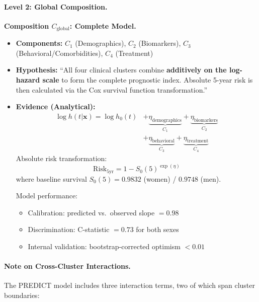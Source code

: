 \documentclass{article}
\begin{document}
\paragraph{Level 2: Global Composition.}

\textbf{Composition $C_{\text{global}}$: Complete Model.}
\begin{itemize}
    \item \textbf{Components:} $C_1$ (Demographics), $C_2$ (Biomarkers), $C_3$ (Behavioral/Comorbidities), $C_4$ (Treatment)
    \item \textbf{Hypothesis:} ``All four clinical clusters combine \textbf{additively on the log-hazard scale} to form the complete prognostic index. Absolute 5-year risk is then calculated via the Cox survival function transformation.''
    \item \textbf{Evidence (Analytical):}
    \begin{equation}
    \begin{split}
        \log h(t|\mathbf{x}) = \log h_0(t) &+ \underbrace{\eta_{\text{demographics}}}_{C_1} + \underbrace{\eta_{\text{biomarkers}}}_{C_2} \\
        &+ \underbrace{\eta_{\text{behavioral}}}_{C_3} + \underbrace{\eta_{\text{treatment}}}_{C_4}
    \end{split}
    \end{equation}
    Absolute risk transformation:
    \[
    \text{Risk}_{5\text{yr}} = 1 - S_0(5)^{\exp(\eta)}
    \]
    where baseline survival $S_0(5) = 0.9832$ (women) / $0.9748$ (men).
    
    Model performance:
    \begin{itemize}
        \item Calibration: predicted vs.\ observed slope $= 0.98$
        \item Discrimination: C-statistic $= 0.73$ for both sexes
        \item Internal validation: bootstrap-corrected optimism $< 0.01$
    \end{itemize}
\end{itemize}

\paragraph{Note on Cross-Cluster Interactions.}

The PREDICT model includes three interaction terms, two of which span cluster boundaries:
\end{document}
